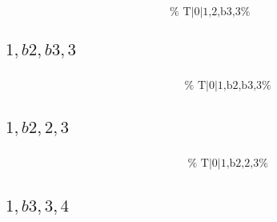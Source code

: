 \documentclass[english]{./gbook}
\begin{document}
\begin{large}
\[\begin{array}{ll}
&
	\text{
	}
\end{array}
\]


\subsection*{$1,b2,b3,3$}
\[
\begin{array}{ll}
	\begin{array}{c}
		\begin{array}{ccc}
			&%
			&%
		\end{array}
		\\
		\begin{array}{cc}
			&%
		\end{array}
	\end{array}

&
	\text{
	}
\end{array}
\]

\subsection*{$1,b2,2,3$}
\[
\begin{array}{ll}
	\begin{array}{c}
		\begin{array}{ccc}
			&%
			&%
		\end{array}
		\\
		\begin{array}{cc}
			&%
		\end{array}
	\end{array}

&
	\text{
	}
\end{array}
\]

\subsection*{$1,b3,3,4$}
\[
\begin{array}{ll}
	\begin{array}{c}
		\begin{array}{ccc}
			&%
			&%
		\end{array}
		\\
		\begin{array}{cc}
			&%
		\end{array}
	\end{array}


\end{array}\]
\end{large}
\end{document}
